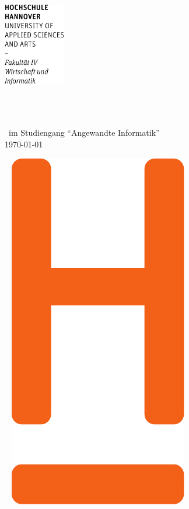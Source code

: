   \thispagestyle{empty} %
\includegraphics[width=0.2\textwidth]{resource/Wortmarke_WI_schwarz}

   {  ~ \sffamily
  \vfill
  {\Huge\bfseries \thetopic}
  \bigskip

  {\Large 
 \theauthor \\[2ex]
 \thetitle ~im Studiengang "`Angewandte Informatik"' 
 \\[5ex]
   \today } 
}
 \vfill
  
  ~ \hfill
  \includegraphics[height=0.3\paperheight]{resource/H_WI_Pantone1665} 

\vspace*{-3cm}
